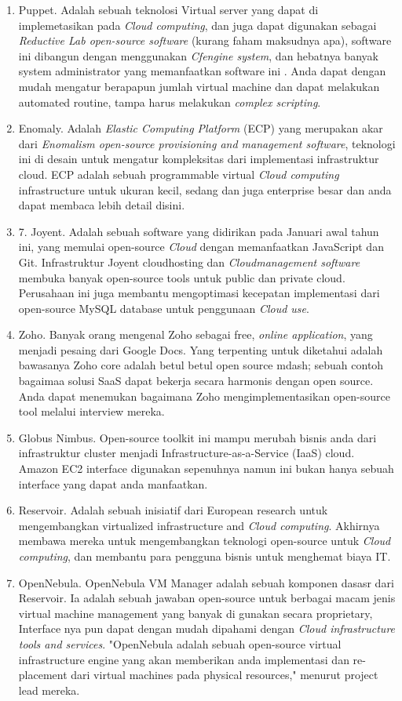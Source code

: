 \begin{enumerate}
\item Puppet. Adalah sebuah teknolosi Virtual server yang dapat di implemetasikan pada \textit{Cloud computing}, dan juga dapat digunakan sebagai \textit{Reductive Lab open-source software} (kurang faham maksudnya apa), software ini dibangun dengan menggunakan \textit{Cfengine system}, dan hebatnya banyak system administrator yang memanfaatkan software ini . Anda dapat dengan mudah mengatur berapapun jumlah virtual machine dan dapat melakukan  automated routine, tampa harus melakukan \textit{complex scripting}.
\item Enomaly. Adalah \textit{Elastic Computing Platform} (ECP) yang merupakan akar dari \textit{ Enomalism open-source provisioning and management software}, teknologi ini di desain untuk mengatur kompleksitas dari implementasi infrastruktur cloud.  ECP  adalah  sebuah  programmable virtual \textit{Cloud computing} infrastructure untuk ukuran kecil, sedang dan juga enterprise besar dan anda dapat  membaca lebih detail disini.
\item 7.	Joyent. Adalah sebuah software yang didirikan pada Januari awal tahun ini, yang memulai open-source  \textit{Cloud} dengan  memanfaatkan  JavaScript  dan  Git.  Infrastruktur  Joyent  cloudhosting dan \textit{Cloudmanagement software} membuka banyak open-source tools untuk public dan private cloud. Perusahaan ini juga membantu mengoptimasi kecepatan  implementasi dari open-source MySQL database untuk penggunaan \textit{Cloud use}.
\item Zoho. Banyak orang mengenal Zoho sebagai free, \textit{online application}, yang menjadi pesaing dari Google Docs. Yang terpenting untuk diketahui adalah bawasanya Zoho core adalah betul betul open source mdash; sebuah contoh bagaimaa solusi SaaS dapat  bekerja  secara harmonis dengan open source. Anda dapat menemukan bagaimana Zoho mengimplementasikan open-source tool melalui interview  mereka.
\item Globus Nimbus. Open-source toolkit ini mampu merubah bisnis anda dari infrastruktur  cluster menjadi Infrastructure-as-a-Service (IaaS) cloud. Amazon EC2 interface digunakan sepenuhnya namun ini bukan hanya sebuah interface yang dapat anda manfaatkan.
\item Reservoir. Adalah sebuah inisiatif dari European research  untuk  mengembangkan virtualized infrastructure and \textit{Cloud computing}. Akhirnya membawa mereka untuk mengembangkan teknologi open-source untuk \textit{Cloud computing}, dan membantu para pengguna bisnis untuk menghemat  biaya IT.
\item OpenNebula. OpenNebula VM Manager adalah sebuah komponen dasasr dari Reservoir. Ia adalah sebuah jawaban open-source untuk berbagai macam jenis virtual machine management yang banyak di gunakan secara proprietary, Interface nya pun dapat dengan mudah dipahami dengan \textit{Cloud infrastructure tools and services}.  "OpenNebula  adalah sebuah open-source virtual infrastructure engine yang akan memberikan anda implementasi dan re-placement dari virtual machines pada physical resources," menurut project lead mereka.
\end{enumerate}
